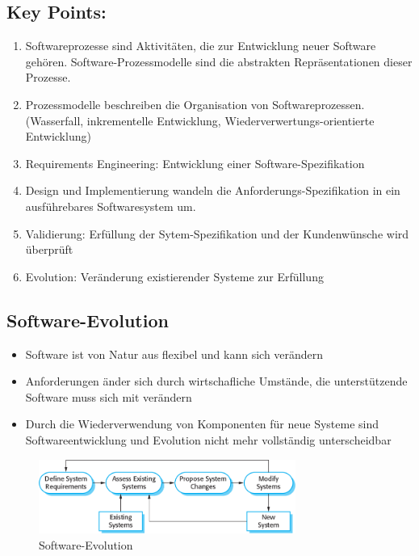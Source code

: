 \subsection{Key Points:}
\begin{enumerate}
    \item Softwareprozesse sind Aktivitäten, die zur Entwicklung neuer Software gehören. Software-Prozessmodelle sind die abstrakten Repräsentationen dieser Prozesse. 
    \item Prozessmodelle beschreiben die Organisation von Softwareprozessen. (Wasserfall, inkrementelle Entwicklung, Wiederverwertungs-orientierte Entwicklung) 
    \item Requirements Engineering: Entwicklung einer Software-Spezifikation 
    \item Design und Implementierung wandeln die Anforderungs-Spezifikation in ein ausführebares Softwaresystem um. 
    \item Validierung: Erfüllung der Sytem-Spezifikation und der Kundenwünsche wird überprüft
    \item Evolution: Veränderung existierender Systeme zur Erfüllung 
\end{enumerate}


\subsection{Software-Evolution}
\begin{itemize}
    \item Software ist von Natur aus flexibel und kann sich verändern
    \item Anforderungen änder sich durch wirtschafliche Umstände, die unterstützende Software muss sich mit verändern
    \item Durch die Wiederverwendung von Komponenten für neue Systeme sind Softwareentwicklung und Evolution nicht mehr vollständig unterscheidbar
\end{itemize}
\begin{figure}[h]
    \centering
    \includegraphics[width=0.75\textwidth]{mainmatter/pics/evolution.png}
    \caption{Software-Evolution}
\end{figure}


